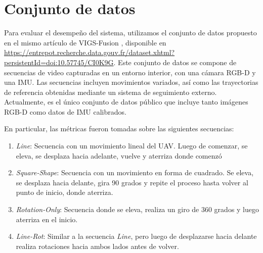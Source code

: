 \section{Conjunto de datos}

Para evaluar el desempeño del sistema, utilizamos el conjunto de datos propuesto en el mismo artículo de VIGS-Fusion \cite{ndoye2025vigs}, disponible en \url{https://entrepot.recherche.data.gouv.fr/dataset.xhtml?persistentId=doi:10.57745/CI0K9G}. Este conjunto de datos se compone de secuencias de video capturadas en un entorno interior, con una cámara RGB-D y una IMU. Las secuencias incluyen movimientos variados, así como las trayectorias de referencia obtenidas mediante un sistema de seguimiento externo. Actualmente, es el único conjunto de datos público que incluye tanto imágenes RGB-D como datos de IMU calibrados.

En particular, las métricas fueron tomadas sobre las siguientes secuencias:

\begin{enumerate}
    \item \textit{Line}: Secuencia con un movimiento lineal del UAV. Luego de comenzar, se eleva, se desplaza hacia adelante, vuelve y aterriza donde comenzó
    \item \textit{Square-Shape}: Secuencia con un movimiento en forma de cuadrado. Se eleva, se desplaza hacia delante, gira 90 grados y repite el proceso hasta volver al punto de inicio, donde aterriza.
    \item \textit{Rotation-Only}: Secuencia donde se eleva, realiza un giro de 360 grados y luego aterriza en el inicio.
    \item \textit{Line-Rot}: Similar a la secuencia \textit{Line}, pero luego de desplazarse hacia delante realiza rotaciones hacia ambos lados antes de volver.
\end{enumerate}